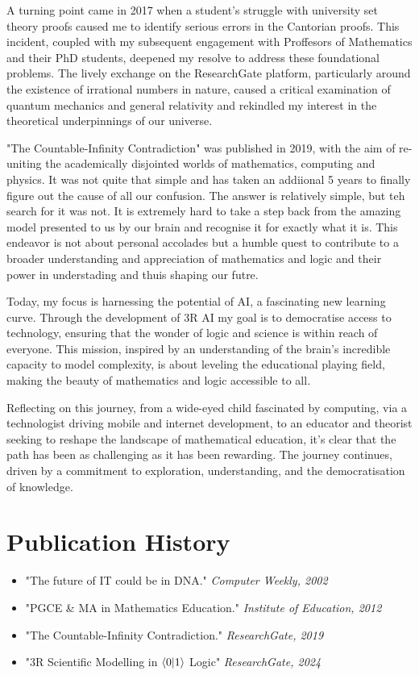 \documentclass[12pt]{article}
\begin{document}
A turning point came in 2017 when a student's struggle with university set theory proofs caused me to identify serious errors in the Cantorian proofs. This incident, coupled with my subsequent engagement with Proffesors of Mathematics and their PhD students, deepened my resolve to address these foundational problems. The lively exchange on the ResearchGate platform, particularly around the existence of irrational numbers in nature, caused a critical examination of quantum mechanics and general relativity and rekindled my interest in the theoretical underpinnings of our universe.

"The Countable-Infinity Contradiction"\cite{Ed2019xZFC} was published in 2019, with the aim of re-uniting the academically disjointed worlds of mathematics, computing and physics. It was not quite that simple and has taken an addiional 5 years to finally figure out the cause of all our confusion. The answer is relatively simple, but teh search for it was not. It is extremely hard to take a step back from the amazing model presented to us by our brain and recognise it for exactly what it is. This endeavor is not about personal accolades but a humble quest to contribute to a broader understanding and appreciation of mathematics and logic and their power in understading and thuis shaping our futre.

Today, my focus is harnessing the potential of AI, a fascinating new learning curve. Through the development of 3R AI my goal is to democratise access to technology, ensuring that the wonder of logic and science is within reach of everyone. This mission, inspired by an understanding of the brain's incredible capacity to model complexity, is about leveling the educational playing field, making the beauty of mathematics and logic accessible to all.

Reflecting on this journey, from a wide-eyed child fascinated by computing, via a technologist driving mobile and internet development, to an educator and theorist seeking to reshape the landscape of mathematical education, it's clear that the path has been as challenging as it has been rewarding. The journey continues, driven by a commitment to exploration, understanding, and the democratisation of knowledge.

\section*{Publication History}

\begin{itemize}
    \item "The future of IT could be in DNA." \textit{Computer Weekly, 2002}
    \item "PGCE \& MA in Mathematics Education." \textit{Institute of Education, 2012}
    \item "The Countable-Infinity Contradiction." \textit{ResearchGate, 2019}
    \item "3R Scientific Modelling in \(\langle 0 | 1 \rangle\) Logic" \textit{ResearchGate, 2024}
\end{itemize}
\end{document}
